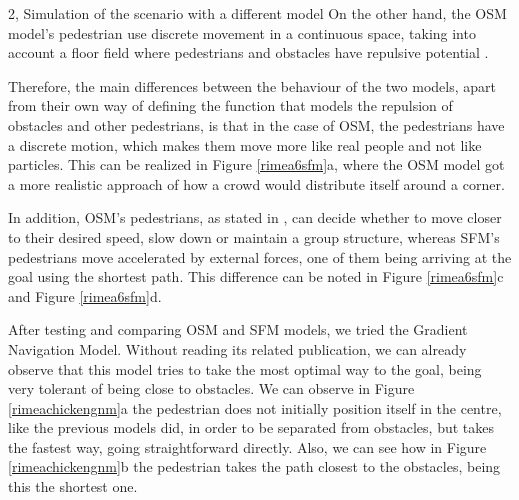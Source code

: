 \begin{task}{2, Simulation of the scenario with a different model}
On the other hand, the OSM model's pedestrian use discrete movement in a continuous space, taking into account a floor field where pedestrians and obstacles have repulsive potential \cite{seitz2012natural}. 

Therefore, the main differences between the behaviour of the two models, apart from their own way of defining the function that models the repulsion of obstacles and other pedestrians, is that in the case of OSM, the pedestrians have a discrete motion, which makes them move more like real people and not like particles. This can be realized in Figure \ref{rimea6sfm}a, where the OSM model got a more realistic approach of how a crowd would distribute itself around a corner.

In addition, OSM's pedestrians, as stated in \cite{seitz2012natural}, can decide whether to move closer to their desired speed, slow down or maintain a group structure, whereas SFM's pedestrians move accelerated by external forces, one of them being arriving at the goal using the shortest path. This difference can be noted in Figure \ref{rimea6sfm}c and Figure \ref{rimea6sfm}d.


After testing and comparing OSM and SFM models, we tried the Gradient Navigation Model. Without reading its related publication, we can already observe that this model tries to take the most optimal way to the goal, being very tolerant of being close to obstacles. We can observe in Figure \ref{rimeachickengnm}a the pedestrian does not initially position itself in the centre, like the previous models did, in order to be separated from obstacles, but takes the fastest way, going straightforward directly. Also, we can see how in Figure \ref{rimeachickengnm}b the pedestrian takes the path closest to the obstacles, being this the shortest one.



\end{task}
